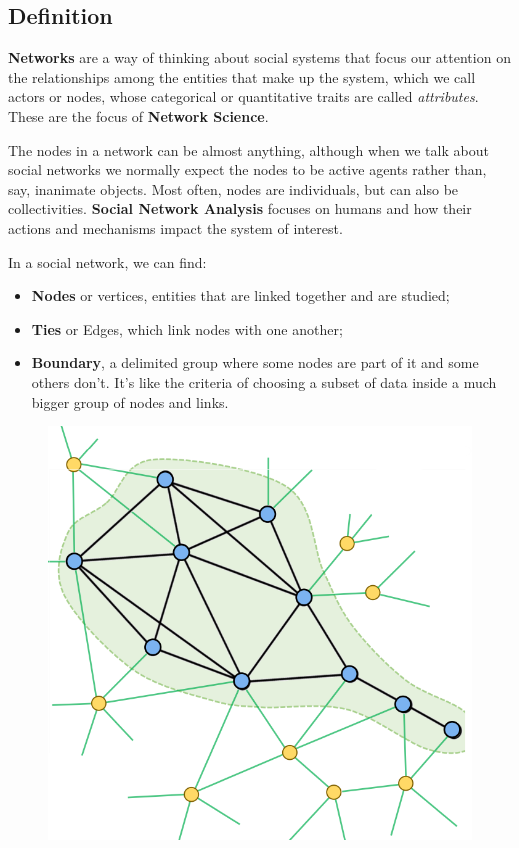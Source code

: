 \documentclass[
  notitlepage,
  onecolumn,
  openany]{book}
\providecommand{\tightlist}{%
  \setlength{\itemsep}{0pt}\setlength{\parskip}{0pt}}
\begin{document}
\hypertarget{definition}{%
\subsection{Definition}\label{definition}}

\textbf{Networks} are a way of thinking about social systems that focus our attention on the relationships among the entities that make up the system, which we call actors or nodes, whose categorical or quantitative traits are called \emph{attributes}. These are the focus of \textbf{Network Science}.

The nodes in a network can be almost anything, although when we talk about social networks we normally expect the nodes to be active agents rather than, say, inanimate objects. Most often, nodes are individuals, but can also be collectivities. \textbf{Social Network Analysis} focuses on humans and how their actions and mechanisms impact the system of interest.

In a social network, we can find:

\begin{itemize}
\tightlist
\item
  \textbf{Nodes} or vertices, entities that are linked together and are studied;
\item
  \textbf{Ties} or Edges, which link nodes with one another;
\item
  \textbf{Boundary}, a delimited group where some nodes are part of it and some others don't. It's like the criteria of choosing a subset of data inside a much bigger group of nodes and links.
\end{itemize}

\begin{figure}[h!]

{\centering \includegraphics[width=0.5\linewidth]{images/01-Introduction/Untitled} 

}

\end{figure}
\end{document}
